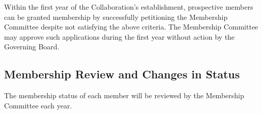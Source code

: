 \documentclass[12pt]{article}
\begin{document}
Within the first year of the Collaboration's establishment, prospective members can be granted membership by successfully petitioning the Membership Committee despite not satisfying the above criteria.  The Membership Committee may approve such applications during the first year without action by the Governing Board.  


\subsection{Membership Review and Changes in Status}
The membership status of each member will be reviewed by the Membership Committee each year. 
\end{document}
